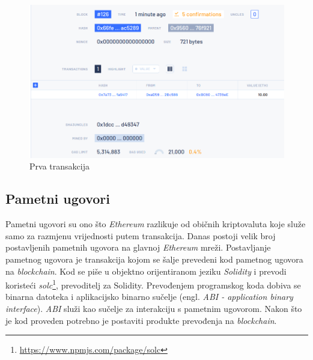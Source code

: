 \documentclass[times, utf8, zavrsni, numeric]{fer}
\begin{document}
\pagebreak

\begin{figure}[ht]
  \includegraphics[width=\textwidth]{blocktx.png}
  \caption{Prva transakcija}
  \centering
  \vfill
\end{figure}

\subsection{Pametni ugovori}
Pametni ugovori su ono što \emph{Ethereum} razlikuje od običnih kriptovaluta koje služe samo za razmjenu vrijednosti putem transakcija. Danas postoji velik broj postavljenih 
pametnih ugovora na glavnoj \emph{Ethereum} mreži. Postavljanje pametnog ugovora je transakcija kojom se šalje prevedeni kod pametnog ugovora na \emph{blockchain}.
Kod se piše u objektno orijentiranom jeziku \emph{Solidity} i prevodi koristeći \emph{solc}\footnote{\url{https://www.npmjs.com/package/solc}}, prevoditelj za Solidity. Prevođenjem programskog koda dobiva se binarna datoteka
i aplikacijsko binarno sučelje (engl. \emph{ABI - application binary interface}). \emph{ABI} služi kao sučelje za interakciju s pametnim ugovorom. Nakon što je kod
proveden potrebno je postaviti produkte prevođenja na \emph{blockchain}.
\end{document}
